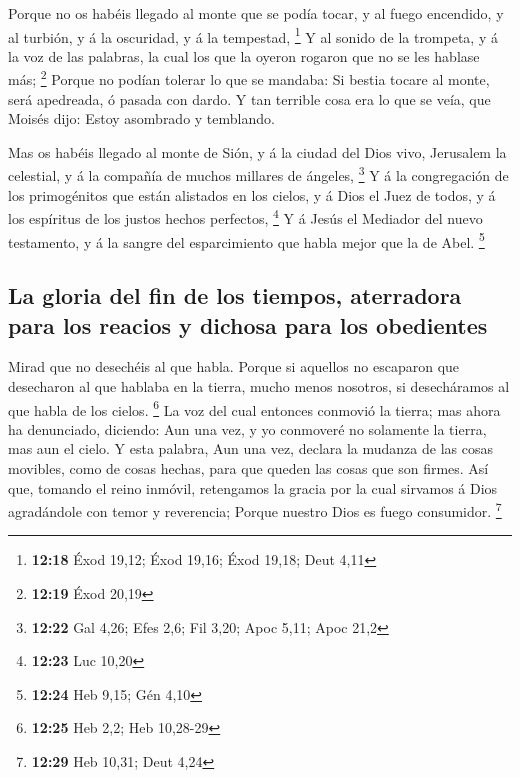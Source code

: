  Porque no os habéis llegado al monte que se podía tocar, y
al fuego encendido, y al turbión, y á la oscuridad, y á la tempestad,
\footnote{\textbf{12:18} Éxod 19,12; Éxod 19,16; Éxod 19,18; Deut 4,11}
 Y al sonido de la trompeta, y á la voz de las palabras, la
cual los que la oyeron rogaron que no se les hablase más; \footnote{\textbf{12:19}
  Éxod 20,19}  Porque no podían tolerar lo que se mandaba:
Si bestia tocare al monte, será apedreada, ó pasada con dardo.
 Y tan terrible cosa era lo que se veía, que Moisés dijo:
Estoy asombrado y temblando.

 Mas os habéis llegado al monte de Sión, y á la ciudad del
Dios vivo, Jerusalem la celestial, y á la compañía de muchos millares de
ángeles, \footnote{\textbf{12:22} Gal 4,26; Efes 2,6; Fil 3,20; Apoc
  5,11; Apoc 21,2}  Y á la congregación de los primogénitos
que están alistados en los cielos, y á Dios el Juez de todos, y á los
espíritus de los justos hechos perfectos, \footnote{\textbf{12:23} Luc
  10,20}  Y á Jesús el Mediador del nuevo testamento, y á
la sangre del esparcimiento que habla mejor que la de Abel. \footnote{\textbf{12:24}
  Heb 9,15; Gén 4,10}

\hypertarget{la-gloria-del-fin-de-los-tiempos-aterradora-para-los-reacios-y-dichosa-para-los-obedientes}{%
\subsection{La gloria del fin de los tiempos, aterradora para los
reacios y dichosa para los
obedientes}\label{la-gloria-del-fin-de-los-tiempos-aterradora-para-los-reacios-y-dichosa-para-los-obedientes}}

 Mirad que no desechéis al que habla. Porque si aquellos no
escaparon que desecharon al que hablaba en la tierra, mucho menos
nosotros, si desecháramos al que habla de los cielos. \footnote{\textbf{12:25}
  Heb 2,2; Heb 10,28-29}  La voz del cual entonces conmovió
la tierra; mas ahora ha denunciado, diciendo: Aun una vez, y yo
conmoveré no solamente la tierra, mas aun el cielo.  Y esta
palabra, Aun una vez, declara la mudanza de las cosas movibles, como de
cosas hechas, para que queden las cosas que son firmes. 
Así que, tomando el reino inmóvil, retengamos la gracia por la cual
sirvamos á Dios agradándole con temor y reverencia;  Porque
nuestro Dios es fuego consumidor. \footnote{\textbf{12:29} Heb 10,31;
  Deut 4,24}

